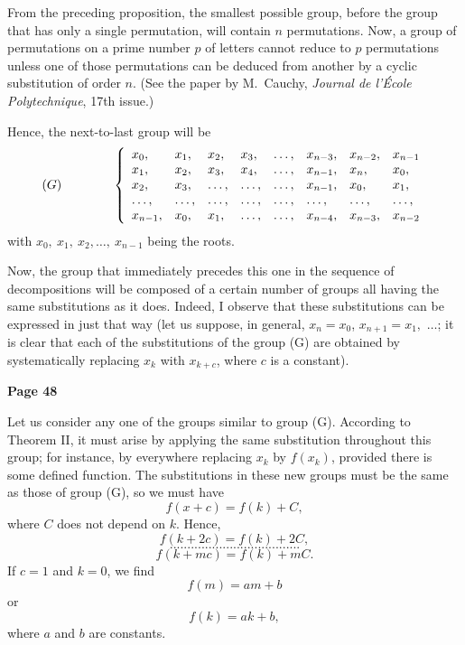 \documentclass{article}
\begin{document}
From the preceding proposition, the smallest possible group, before the group that has only a single permutation, will contain $n$ permutations. Now, a group of permutations on a prime number $p$ of letters cannot reduce to $p$ permutations unless one of those permutations can be deduced from another by a cyclic substitution of order $n.$ (See the paper by M.\ Cauchy, \emph{Journal de l'École Polytechnique}, 17th issue.)

Hence, the next-to-last group will be
\[
(G)\quad\quad\quad\quad \left\{
\begin{array}{l l l l l l l l}
x_0, & x_1, & x_2, & x_3, & \dots, & x_{n-3}, & x_{n-2}, & x_{n-1} \\
x_1, & x_2, & x_3, & x_4, & \dots, & x_{n-1}, & x_n, & x_0, \\
x_2, & x_3, & \dots, &  \dots, &  \dots, & x_{n-1}, & x_0, & x_1, \\
\dots, & \dots, & \dots, & \dots, & \dots, & \dots, & \dots, & \dots, \\
x_{n-1}, & x_0, & x_{1}, & \dots, & \dots, & x_{n-4}, & x_{n-3}, & x_{n-2}
\end{array}
\right.
\]
with $x_0,\ x_1,\ x_2,\dots,\ x_{n-1}$ being the roots.

Now, the group that immediately precedes this one in the sequence of decompositions will be composed of a certain number of groups all having the same substitutions as it does. Indeed, I observe that these substitutions can be expressed in just that way (let us suppose, in general, $x_n=x_0$, $x_{n+1}=x_1,$ $\dots$; it is clear that each of the substitutions of the group (G) are obtained by systematically replacing $x_k$ with $x_{k + c}$, where $c$ is a constant).



\newpage

\centerline{\textbf{Page 48}}

\medskip


Let us consider any one of the groups similar to group (G). According to Theorem II, it must arise by applying the same substitution throughout this group; for instance, by everywhere replacing $x_k$ by $f(x_k)$, provided there is some defined function. The substitutions in these new groups must be the same as those of group (G), so we must have
\[
f(x + c) = f(k) + C,
\]
where $C$ does not depend on $k$. Hence,
\[
f(k + 2c) = f(k) + 2C,
\]
\[
.....................................
\]
\[
f(k + mc) = f(k) + mC.
\]
If $c=1$ and $k=0$, we find
\[
f(m) = am + b
\]
or
\[
f(k) = a k + b,
\]
where $a$ and $b$ are constants.
\end{document}

